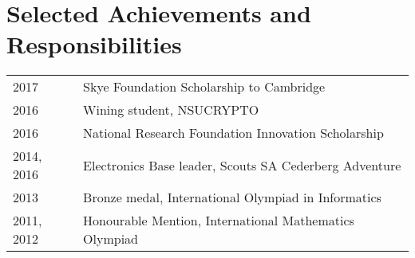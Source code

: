 \section{Selected Achievements and Responsibilities}
\begin{tabular}{R{2.5cm}|l}
2017 & Skye Foundation Scholarship to Cambridge\\
2016 & Wining student, NSUCRYPTO\\
2016 & National Research Foundation Innovation Scholarship\\
2014, 2016 & Electronics Base leader, Scouts SA Cederberg Adventure\\
2013 & Bronze medal, International Olympiad in Informatics\\
2011, 2012 & Honourable Mention, International Mathematics Olympiad\\
\end{tabular}
